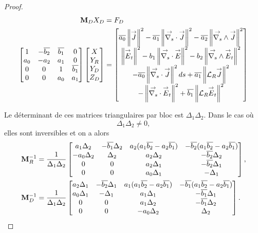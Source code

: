 \begin{proof}
    \begin{align*}
      \mathbf{M}_D  X_D & =  F_D
      \\
      \begin{bmatrix}
        1 & -{\overline{b_2}} & {\overline{b_1}} & 0
        \\
        a_0 & -a_2 & a_1 & 0
        \\
        0 & 0 & 1 & {\overline{b_1}}
        \\
        0 & 0 & a_0 & a_1
      \end{bmatrix}
      \begin{bmatrix}
        X
        \\
        Y_R
        \\
        Y_D
        \\
        Z_D
      \end{bmatrix}
      & =
      \begin{bmatrix}
        {\overline{a_0}} \left\lVert{\overset{\rightarrow}{J}}\right\rVert^2 - {\overline{a_1}} \left\lVert{\overset{\rightarrow}{\nabla_s}} \cdot {\overset{\rightarrow}{J}}\right\rVert^2 - {\overline{a_2}} \left\lVert{\overset{\rightarrow}{\nabla_s}} \wedge {\overset{\rightarrow}{J}}\right\rVert^2  \\
        \left\lVert{\overset{\rightarrow}{E}}_t\right\rVert^2   - b_1 \left\lVert{\overset{\rightarrow}{\nabla_s}} \cdot {\overset{\rightarrow}{E}} \right\rVert^2  - b_2 \left\lVert{\overset{\rightarrow}{\nabla_s}} \wedge {\overset{\rightarrow}{E}}_t\right\rVert^2  \\
        -{\overline{a_0}} \left\lVert{\overset{\rightarrow}{\nabla_s}} \cdot {\overset{\rightarrow}{J}}\right\rVert^2ds + {\overline{a_1}} \left\lVert{\mathcal{L}_R} {\overset{\rightarrow}{J}}\right\rVert^2  \\
        -\left\lVert{\overset{\rightarrow}{\nabla_s}} \cdot {\overset{\rightarrow}{E}}_t\right\rVert^2   + {\overline{b_1}} \left\lVert{\mathcal{L}_R} {\overset{\rightarrow}{E}}_t\right\rVert^2 
      \end{bmatrix}
    \end{align*}

    Le déterminant de ces matrices triangulaires par bloc est \(\Delta_1\Delta_2\). Dans le cas où
    \begin{equation*}
      \label{eq:unicite:ci3:csu3-cn-det}
      \Delta_1\Delta_2 \not = 0,
    \end{equation*}
    elles sont inversibles et on a alors
    \begin{align*}
      \mathbf{M}_R^{-1} & =\dfrac{1}{\Delta_1\Delta_2}
      \begin{bmatrix}
        a_1 \Delta_2 & -{\overline{b_1}}\Delta_2 & a_2(a_1{\overline{b_2}}-a_2{\overline{b_1}}) & -{\overline{b_2}}(a_1{\overline{b_2}}-a_2{\overline{b_1}})
        \\
        -a_0 \Delta_2 & \Delta_2 & a_2\Delta_2 & -{\overline{b_2}}\Delta_2
        \\
        0 & 0 & a_2\Delta_1 & -{\overline{b_2}}\Delta_1
        \\
        0 & 0 & a_0\Delta_1 & -\Delta_1
      \end{bmatrix},
      \\
      \mathbf{M}_D^{-1} & =\dfrac{1}{\Delta_1\Delta_2}
      \begin{bmatrix}
        a_2 \Delta_1 & -{\overline{b_2}}\Delta_1 & a_1(a_1{\overline{b_2}}-a_2{\overline{b_1}}) & -{\overline{b_1}}(a_1{\overline{b_2}}-a_2{\overline{b_1}})
        \\
        a_0 \Delta_1 & -\Delta_1 & a_1\Delta_1 & -{\overline{b_1}}\Delta_1
        \\
        0 & 0 & a_1\Delta_2 & -{\overline{b_1}}\Delta_2
        \\
        0 & 0 & -a_0\Delta_2 & \Delta_2
      \end{bmatrix}.
    \end{align*}
    

\end{proof}
